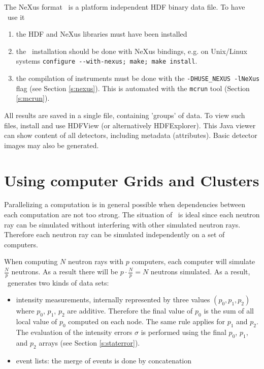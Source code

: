 The NeXus format~\cite{nexus_webpage} is a platform independent HDF binary data file. To have \MCS\ use it
\begin{enumerate}
\item the HDF and NeXus libraries must have been installed
\item the \MCS\ installation should be done with NeXus bindings, e.g. on Unix/Linux systems \verb+configure --with-nexus; make; make install+.
\item  the compilation of instruments must be done with the \verb+-DHUSE_NEXUS -lNeXus+ flag (see Section \ref{s:nexus}). This is automated with the \verb+mcrun+ tool (Section \ref{s:mcrun}).
\end{enumerate}
All results are saved in a single file, containing 'groups' of data. To view such files, install and use HDFView (or alternatively HDFExplorer). This Java viewer can show content of all detectors, including metadata (attributes). Basic detector images may also be generated.

\section{Using computer Grids and Clusters}
\label{s:run-mpi}

Parallelizing a computation is in general possible when dependencies between
  each computation are not too strong. The situation of \MCS\ is
  ideal since each neutron ray can be simulated without interfering with
  other simulated neutron rays. Therefore each neutron ray can be simulated
  independently on a set of computers.
  
When computing $N$ neutron rays with
$p$ computers, each computer will simulate $\frac{N}{p}$
neutrons. As a result there will be $p \cdot \frac{N}{p} = N$
neutrons simulated. As a result, \MCS\ generates two kinds of data sets:
\begin{itemize}
\item intensity measurements, internally represented by three
  values $(p_0, p_1, p_2)$ where $p_0$, $p_1$, $p_2$ are
  additive. Therefore the final value of $p_0$ is the sum of all
  local value of  $p_0$ computed on each node. The same rule applies
  for $p_1$ and $p_2$. The evaluation of the intensity errors $\sigma$
  is performed using the final $p_0$, $p_1$, and $p_2$ arrays (see Section \ref{s:staterror}).
\item event lists: the merge of events is done by concatenation
\end{itemize}


